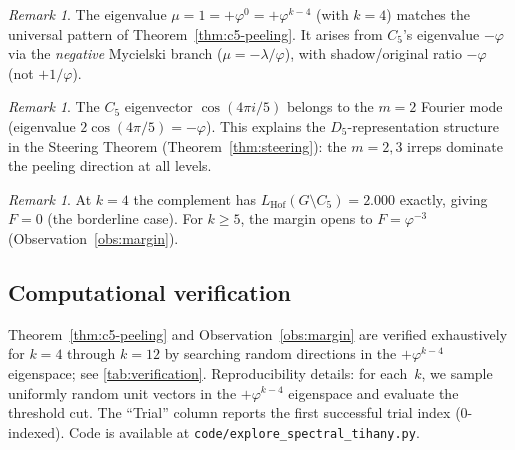 \documentclass[11pt,a4paper]{amsart}
\theoremstyle{plain}
\theoremstyle{definition}
\theoremstyle{remark}
\newtheorem{remark}[theorem]{Remark}
\newcommand{\vp}{\varphi}
\newcommand{\LHof}{L_{\mathrm{Hof}}}
\begin{document}
\begin{remark}\label{rem:grotzsch-1}
The eigenvalue $\mu = 1 = +\vp^0 = +\vp^{k-4}$ (with $k = 4$) matches the
universal pattern of Theorem~\ref{thm:c5-peeling}.  It arises from $C_5$'s eigenvalue
$-\vp$ via the \emph{negative} Mycielski branch ($\mu = -\lambda/\vp$), with
shadow/original ratio $-\vp$ (not $+1/\vp$).
\end{remark}

\begin{remark}\label{rem:grotzsch-2}
The $C_5$ eigenvector $\cos(4\pi i/5)$ belongs to the $m = 2$ Fourier mode
(eigenvalue $2\cos(4\pi/5) = -\vp$).  This explains the
$D_5$-representation structure in the Steering Theorem (Theorem~\ref{thm:steering}): the $m = 2,3$ irreps
dominate the peeling direction at all levels.
\end{remark}

\begin{remark}\label{rem:grotzsch-3}
At $k = 4$ the complement has $\LHof(G\setminus C_5) = 2.000$ exactly, giving
$F = 0$ (the borderline case).  For $k\geq 5$, the margin opens to
$F = \vp^{-3}$ (Observation~\ref{obs:margin}).
\end{remark}

\subsection{Computational verification}\label{ssec:comp-verify}

Theorem~\ref{thm:c5-peeling} and Observation~\ref{obs:margin} are verified exhaustively for
$k = 4$ through $k = 12$ by searching random directions in the $+\vp^{k-4}$
eigenspace; see \cref{tab:verification}.  Reproducibility details: for each~$k$,
we sample uniformly random unit vectors in the $+\vp^{k-4}$ eigenspace and
evaluate the threshold cut.  The ``Trial'' column reports the first successful
trial index (0-indexed).  Code is available at
\texttt{code/explore\_spectral\_tihany.py}.
\end{document}
